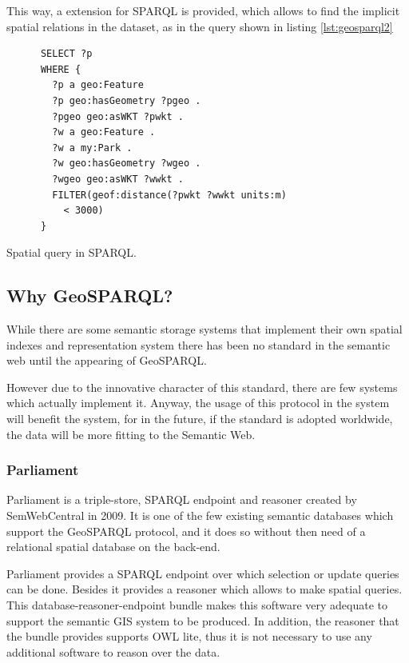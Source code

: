 This way, a extension for SPARQL is provided, which allows to find the implicit spatial relations in the dataset, as in the query shown in listing \ref{lst:geosparql2}

\begin{listing}[ht]\centering
  \begin{minipage}{.6\textwidth}
    \begin{verbatim}
      SELECT ?p
      WHERE {
        ?p a geo:Feature
        ?p geo:hasGeometry ?pgeo .
        ?pgeo geo:asWKT ?pwkt .
        ?w a geo:Feature .
        ?w a my:Park .
        ?w geo:hasGeometry ?wgeo .
        ?wgeo geo:asWKT ?wwkt .
        FILTER(geof:distance(?pwkt ?wwkt units:m)
          < 3000)
      }
    \end{verbatim}
  \end{minipage}
  \caption{Spatial query in SPARQL.}\label{lst:geosparql2}
\end{listing}

\subsection*{Why GeoSPARQL?}

While there are some semantic storage systems that implement their own spatial indexes and representation system there has been no standard in the semantic web until the appearing of GeoSPARQL. 

However due to the innovative character of this standard, there are few systems which actually implement it. Anyway, the usage of this protocol in the system will benefit the system, for in the future, if the standard is adopted worldwide, the data will be more fitting to the Semantic Web.

\subsubsection*{Parliament}

Parliament\texttrademark \cite{parliament} is a triple-store, SPARQL endpoint and reasoner created by SemWebCentral in 2009. It is one of the few existing semantic databases which support the GeoSPARQL protocol, and it does so without then need of a relational spatial database on the back-end. 

Parliament provides a SPARQL endpoint over which selection or update queries can be done. Besides it provides a reasoner which allows to make spatial queries. This database-reasoner-endpoint bundle makes this software very adequate to support the semantic GIS system to be produced. In addition, the reasoner that the bundle provides supports OWL lite, thus it is not necessary to use any additional software to reason over the data. 

